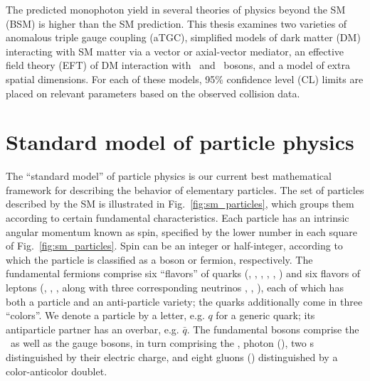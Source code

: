 \documentclass[oneside, letterpaper, 12pt, oldfontcommands]{memoir}
\begin{document}
The predicted monophoton yield in several theories of physics beyond the SM (BSM) is higher than the SM prediction.
This thesis examines two varieties of anomalous triple gauge coupling (aTGC), simplified models of dark matter (DM)
interacting with SM matter via a vector or axial-vector mediator, an effective field theory (EFT) of DM interaction
with  \Pgamma\ and \PZ\ bosons, and a model of extra spatial dimensions. For each of these models, 95\% confidence level (CL)
limits are placed on relevant parameters based on the observed collision data.

\section{Standard model of particle physics} \label{sec:introduction_standard_model}
The ``standard model'' of particle physics is our current best mathematical framework for describing the behavior
of elementary particles. The set of particles described by the SM is illustrated in Fig.~\ref{fig:sm_particles}, which
groups them according to certain fundamental characteristics.
Each particle has an intrinsic angular momentum known as spin, specified by the lower number in each square of Fig.~\ref{fig:sm_particles}.
Spin can be an integer or half-integer, according to which the particle is classified as a boson or fermion, respectively.
The fundamental fermions comprise six ``flavors'' of quarks (\Pu, \Pd, \Pc, \Ps, \Pt, \Pb) and six flavors of leptons
(\Pe, \Pmu, \Ptau, along with three corresponding neutrinos \Pne, \Pnmu, \Pntau),
each of which has both a particle and an anti-particle variety; the quarks additionally come in three ``colors''.
We denote a particle by a letter, e.g. $q$ for a generic quark; its antiparticle partner has an overbar, e.g. $\bar{q}$.
The fundamental bosons comprise the \PH\ as well as the gauge bosons, in turn comprising the \PZ, photon (\Pgamma),
two \PW s distinguished by their electric charge, and eight gluons (\Pg) distinguished by a color-anticolor doublet.
\end{document}
